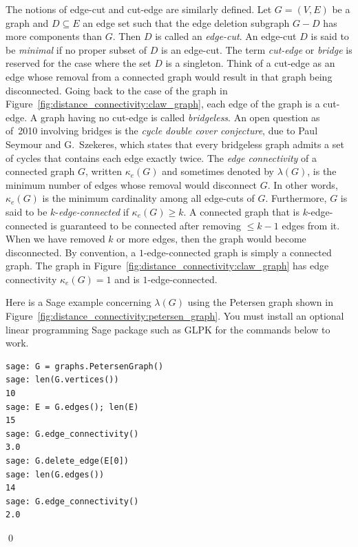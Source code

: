 The notions of edge-cut and cut-edge are similarly defined. Let
$G = (V,E)$ be a graph and $D \subseteq E$ an edge set such that the
edge deletion subgraph $G - D$ has more components than $G$. Then $D$
is called an \emph{edge-cut}. An edge-cut $D$ is said
to be \emph{minimal} if no proper subset of $D$ is an edge-cut. The
term \emph{cut-edge} or \emph{bridge} is
reserved for the case where the set $D$ is a singleton. Think of a
cut-edge as an edge whose removal from a connected graph would result
in that graph being disconnected. Going back to the case of the graph
in Figure~\ref{fig:distance_connectivity:claw_graph}, each edge of the
graph is a cut-edge. A graph having no cut-edge is called
\emph{bridgeless}. An open question as of~2010
involving bridges is the
\emph{cycle double cover conjecture},
due to Paul Seymour and G.~Szekeres,
which states that every bridgeless graph admits a set of cycles that
contains each edge exactly twice. The \emph{edge connectivity} of a
connected graph $G$, written $\kappa_e(G)$ and
sometimes denoted by $\lambda(G)$, is the minimum
number of edges whose removal would disconnect $G$. In other words,
$\kappa_e(G)$ is the minimum cardinality among all edge-cuts of
$G$. Furthermore, $G$ is said to be
$k$-\emph{edge-connected} if
$\kappa_e(G) \geq k$. A connected graph that is $k$-edge-connected is
guaranteed to be connected after removing $\leq k - 1$ edges from
it. When we have removed $k$ or more edges, then the graph would
become disconnected. By convention, a $1$-edge-connected graph is
simply a connected graph. The graph in
Figure~\ref{fig:distance_connectivity:claw_graph} has edge
connectivity $\kappa_e(G) = 1$ and is $1$-edge-connected.

\begin{example}
\rm
Here is a Sage example concerning $\lambda(G)$ using the
Petersen graph shown in
Figure~\ref{fig:distance_connectivity:petersen_graph}. You must
install an optional linear programming Sage package such as GLPK for
the commands below to work.
\begin{lstlisting}
sage: G = graphs.PetersenGraph()
sage: len(G.vertices())
10
sage: E = G.edges(); len(E)
15
sage: G.edge_connectivity()
3.0
sage: G.delete_edge(E[0])
sage: len(G.edges())
14
sage: G.edge_connectivity()
2.0
\end{lstlisting}
\qed
\end{example}

